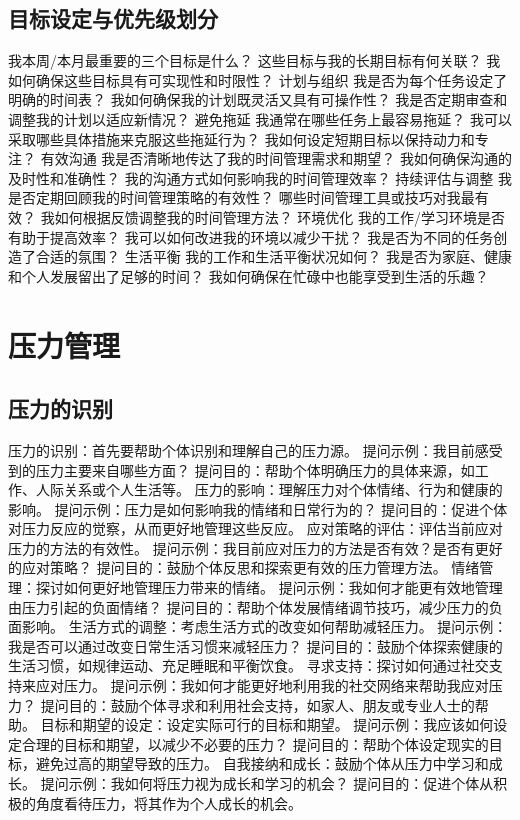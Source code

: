 \documentclass[12pt]{book}
\begin{document}
\subsection{目标设定与优先级划分}
我本周/本月最重要的三个目标是什么？
这些目标与我的长期目标有何关联？
我如何确保这些目标具有可实现性和时限性？
计划与组织
我是否为每个任务设定了明确的时间表？
我如何确保我的计划既灵活又具有可操作性？
我是否定期审查和调整我的计划以适应新情况？
避免拖延
我通常在哪些任务上最容易拖延？
我可以采取哪些具体措施来克服这些拖延行为？
我如何设定短期目标以保持动力和专注？
有效沟通
我是否清晰地传达了我的时间管理需求和期望？
我如何确保沟通的及时性和准确性？
我的沟通方式如何影响我的时间管理效率？
持续评估与调整
我是否定期回顾我的时间管理策略的有效性？
哪些时间管理工具或技巧对我最有效？
我如何根据反馈调整我的时间管理方法？
环境优化
我的工作/学习环境是否有助于提高效率？
我可以如何改进我的环境以减少干扰？
我是否为不同的任务创造了合适的氛围？
生活平衡
我的工作和生活平衡状况如何？
我是否为家庭、健康和个人发展留出了足够的时间？
我如何确保在忙碌中也能享受到生活的乐趣？

\section{压力管理}
\subsection{压力的识别}
压力的识别：首先要帮助个体识别和理解自己的压力源。
提问示例：我目前感受到的压力主要来自哪些方面？
提问目的：帮助个体明确压力的具体来源，如工作、人际关系或个人生活等。
压力的影响：理解压力对个体情绪、行为和健康的影响。
提问示例：压力是如何影响我的情绪和日常行为的？
提问目的：促进个体对压力反应的觉察，从而更好地管理这些反应。
应对策略的评估：评估当前应对压力的方法的有效性。
提问示例：我目前应对压力的方法是否有效？是否有更好的应对策略？
提问目的：鼓励个体反思和探索更有效的压力管理方法。
情绪管理：探讨如何更好地管理压力带来的情绪。
提问示例：我如何才能更有效地管理由压力引起的负面情绪？
提问目的：帮助个体发展情绪调节技巧，减少压力的负面影响。
生活方式的调整：考虑生活方式的改变如何帮助减轻压力。
提问示例：我是否可以通过改变日常生活习惯来减轻压力？
提问目的：鼓励个体探索健康的生活习惯，如规律运动、充足睡眠和平衡饮食。
寻求支持：探讨如何通过社交支持来应对压力。
提问示例：我如何才能更好地利用我的社交网络来帮助我应对压力？
提问目的：鼓励个体寻求和利用社会支持，如家人、朋友或专业人士的帮助。
目标和期望的设定：设定实际可行的目标和期望。
提问示例：我应该如何设定合理的目标和期望，以减少不必要的压力？
提问目的：帮助个体设定现实的目标，避免过高的期望导致的压力。
自我接纳和成长：鼓励个体从压力中学习和成长。
提问示例：我如何将压力视为成长和学习的机会？
提问目的：促进个体从积极的角度看待压力，将其作为个人成长的机会。
\end{document}
